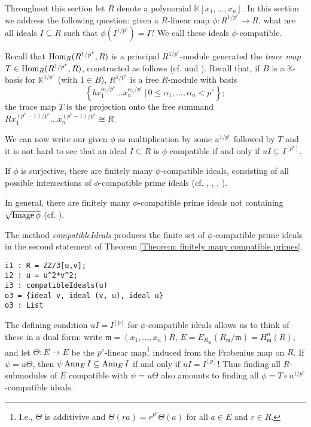 \documentclass{amsart}
\begin{document}
Throughout this section let $R$ denote a polynomial $\mathbb{K}[x_1, \dots, x_n]$. In this section we address the following question:
given a $R$-linear map $\phi: R^{1/p^e} \rightarrow R$, what are all ideals $I\subseteq R$ such that $\phi(I^{1/p^e})=I$?
We call these ideals $\phi$-compatible.

Recall that  $\operatorname{Hom}_R( R^{1/p^e}, R)$  is a principal $R^{1/p^e}$-module generated
the \emph{trace map} $T\in \operatorname{Hom}_R(R^{1/p^e}, R)$, constructed as follows (cf. \cite[Lemma 1.6]{FedderFPureRat} and \cite[Example 1.3.1]{BrionKumarFrobeniusSplitting}).
Recall that, if $B$ is a $\mathbb{K}$-basis for $\mathbb{K}^{1/p^e}$ (with $1\in B$),
$R^{1/p^e}$ is a free $R$-module with basis
$$\left\{ b x_1^{\alpha_1/p^e} \dots x_n^{\alpha_n/p^e} \,|\, 0\leq \alpha_1, \dots, \alpha_n < p^e \right\} ;$$
the trace map $T$ is the projection onto the free summand
$R x_1^{(p^e-1)/p^e} \dots x_n^{(p^e-1)/p^e}\cong R$.

We can now write our given $\phi$ as multiplication by some $u^{1/p^e}$ followed by $T$ and it is not hard to see that
an ideal $I\subseteq R$ is $\phi$-compatible if and only if $u I \subseteq I^{[p^e]}$.

\begin{theorem}\label{Theorem: finitely many compatible primes}
If $\phi$ is surjective, there are finitely many $\phi$-compatible ideals, consisting of all possible intersections
of $\phi$-compatible prime ideals (cf. \cite{KumarMehtaFiniteness}, \cite{SchwedeFAdjunction},
\cite{SharpGradedAnnihilatorsOfModulesOverTheFrobeniusSkewPolynomialRing}, \cite{EnescuHochsterTheFrobeniusStructureOfLocalCohomology}).

In general, there are finitely many $\phi$-compatible prime ideals not containing $\sqrt{\operatorname{Image} \phi}$ (cf. \cite{KatzmanSchwedeAlgorithm}).

\end{theorem}

The method \emph{compatibleIdeals} produces the finite set of $\phi$-compatible prime ideals in the second statement of Theorem \ref{Theorem: finitely many compatible primes}.

\medskip
\begin{verbatim}
i1 : R = ZZ/3[u,v];
i2 : u = u^2*v^2;
i3 : compatibleIdeals(u)
o3 = {ideal v, ideal (v, u), ideal u}
o3 : List
\end{verbatim}
\medskip

The defining condition $u I = I^{[p]}$ for $\phi$-compatible ideals allows us to
think of these in a dual form: write $\mathfrak{m}=(x_1, \dots, x_n)R$,
$E=E_{R_\mathfrak{m}}(R_{\mathfrak{m}}/\mathfrak{m})=H^n_{\mathfrak{m}} (R)$, and let 
$\Theta: E \rightarrow E$ be the $p^e$-linear map\footnote{I.e., $\Theta$ is additivive and $\Theta (r a)= r^{p^e} \Theta (a)$ for all $a\in E$ and $r\in R$.}
induced from the Frobenius map on $R$.
If $\psi=u \Theta$, then $\psi \operatorname{{Ann}}_E I \subseteq \operatorname{{Ann}}_E I$ if and only if $u I = I^{[p]}$!
Thus finding all $R$-submodules of $E$ compatible with $\psi=u \Theta$ also amounts to finding all
$\phi=T \circ u^{1/p^e}$-compatible ideals.
\end{document}
